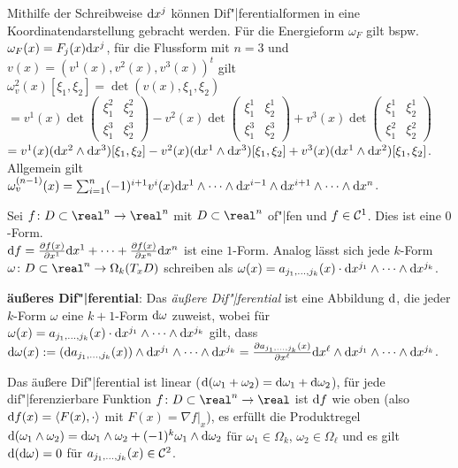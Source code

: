Mithilfe der Schreibweise $\mathrm{d} x^j$ können Dif"|ferentialformen in eine
Koordinatendarstellung gebracht werden.
Für die Energieform $\omega_F$ gilt bspw. $\omega_F(x) = F_j(x) \mathrm{d} x^j$,
für die Flussform mit $n = 3$ und $v(x) = (v^1(x), v^2(x), v^3(x))^t$ gilt 
$\omega^2_v(x)[\xi_1, \xi_2] = \det(v(x), \xi_1, \xi_2)$ \\
$=
v^1(x) \det\begin{pmatrix}\xi_1^2 & \xi_2^2 \\ \xi_1^3 & \xi_2^3\end{pmatrix} -
v^2(x) \det\begin{pmatrix}\xi_1^1 & \xi_2^1 \\ \xi_1^3 & \xi_2^3\end{pmatrix} +
v^3(x) \det\begin{pmatrix}\xi_1^1 & \xi_2^1 \\ \xi_1^2 & \xi_2^2\end{pmatrix}$
\\
$= v^1(x) (\mathrm{d} x^2 \land \mathrm{d} x^3)[\xi_1, \xi_2] -
v^2(x) (\mathrm{d} x^1 \land \mathrm{d} x^3)[\xi_1, \xi_2] +
v^3(x) (\mathrm{d} x^1 \land \mathrm{d} x^2)[\xi_1, \xi_2]$. \\
Allgemein gilt
$\omega_v^{(n-1)}(x) = \sum_{i=1}^n (-1)^{i+1} v^i(x)
\mathrm{d} x^1 \land \dotsb \land \mathrm{d} x^{i-1} \land \mathrm{d} x^{i+1}
\land \dotsb \land \mathrm{d} x^n$.

\linie

Sei $f\colon D \subset \real^n \rightarrow \real^n$ mit $D \subset \real^n$
of"|fen und $f \in \mathcal{C}^1$.
Dies ist eine $0$-Form. \\
$\mathrm{d} f = \frac{\partial f(x)}{\partial x^1} \mathrm{d} x^1 + \dotsb +
\frac{\partial f(x)}{\partial x^n} \mathrm{d} x^n$ ist eine $1$-Form.
Analog lässt sich jede $k$-Form \\
$\omega\colon D \subset \real^n \rightarrow \Omega_k(T_x D)$ schreiben als
$\omega(x) = a_{j_1,\dotsc,j_k}(x) \cdot \mathrm{d} x^{j_1} \land \dotsb \land
\mathrm{d} x^{j_k}$.

\textbf{äußeres Dif"|ferential}:
Das \emph{äußere Dif"|ferential} ist eine Abbildung $\mathrm{d}$,
die jeder $k$-Form $\omega$ eine $k + 1$-Form $\mathrm{d} \omega$ zuweist, wobei
für $\omega(x) = a_{j_1,\dotsc,j_k}(x) \cdot \mathrm{d} x^{j_1} \land \dotsb \land
\mathrm{d} x^{j_k}$ gilt, dass \\
$\mathrm{d} \omega(x) := (\mathrm{d} a_{j_1,\dotsc,j_k}(x)) \land \mathrm{d} x^{j_1} \land
\dotsb \land \mathrm{d} x^{j_k} =
\frac{\partial a_{j_1,\dotsc,j_k}(x)}{\partial x^\ell} \mathrm{d} x^\ell \land
\mathrm{d} x^{j_1} \land \dotsb \land \mathrm{d} x^{j_k}$.

Das äußere Dif"|ferential ist linear
($\mathrm{d}(\omega_1 + \omega_2) = \mathrm{d}\omega_1 + \mathrm{d}\omega_2$),
für jede dif"|ferenzierbare Funktion
$f\colon D \subset \real^n \rightarrow \real$ ist $\mathrm{d} f$ wie
oben (also $\mathrm{d} f(x) = \left\langle{F(x), \cdot}\right\rangle$ mit $F(x) = \nabla f|_x$),
es erfüllt die Produktregel $\mathrm{d}(\omega_1 \land \omega_2) =
\mathrm{d} \omega_1 \land \omega_2 + (-1)^k \omega_1 \land \mathrm{d} \omega_2$ für
$\omega_1 \in \Omega_k$, $\omega_2 \in \Omega_\ell$ und
es gilt $\mathrm{d}(\mathrm{d} \omega) = 0$ für $a_{j_1,\dotsc,j_k}(x) \in \mathcal{C}^2$.

